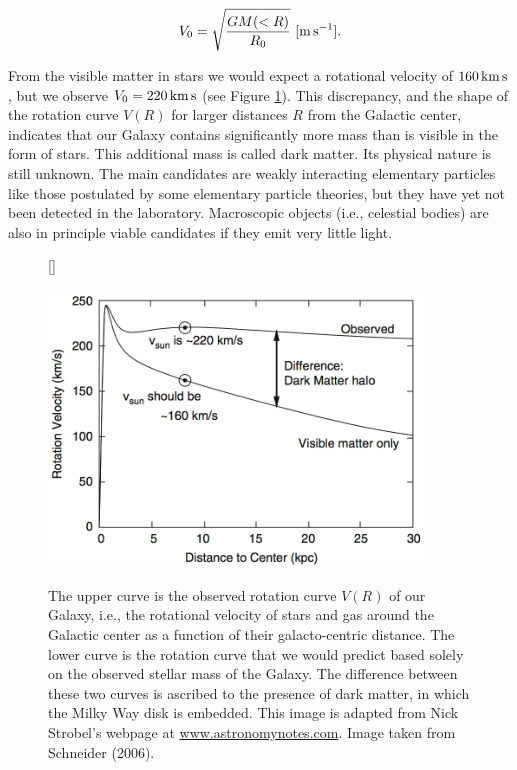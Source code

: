 \documentclass[a4paper,11pt]{article}
\begin{document}
\begin{align*}
    V_0 = \sqrt{\frac{GM(<R)}{R_0}} ~ [{\rm m\,s^{-1}}].
\end{align*}

{\noindent}From the visible matter in stars we would expect a rotational velocity of $160\,{\rm km\,s}$, but we observe $V_0=220\,{\rm km\,s}$ (see Figure \ref{fig:rotationcurve}). This discrepancy, and the shape of the rotation curve $V(R)$ for larger distances $R$ from the Galactic center, indicates that our Galaxy contains significantly more mass than is visible in the form of stars. This additional mass is called dark matter. Its physical nature is still unknown. The main candidates are weakly interacting elementary particles like those postulated by some elementary particle theories, but they have yet not been detected in the laboratory. Macroscopic objects (i.e., celestial bodies) are also in principle viable candidates if they emit very little light.

\begin{figure}[t]
    [\FBwidth]
    {\caption{\footnotesize{The upper curve is the observed rotation curve $V(R)$ of our Galaxy, i.e., the rotational velocity of stars and gas around the Galactic center as a function of their galacto-centric distance. The lower curve is the rotation curve that we would predict based solely on the observed stellar mass of the Galaxy. The difference between these two curves is ascribed to the presence of dark matter, in which the Milky Way disk is embedded. This image is adapted from Nick Strobel's webpage at \href{www.astronomynotes.com}{www.astronomynotes.com}. Image taken from Schneider (2006).}}
    \label{fig:rotationcurve}}
    {\includegraphics[width=10cm]{figures/RotationCurve.png}}
\end{figure}
\end{document}
